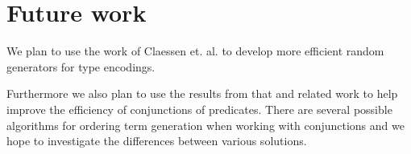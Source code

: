 \section{Future work}
We plan to use the work of Claessen et. al. \cite{Claessen2014generating}
to develop more efficient random
generators for type encodings.

Furthermore we also plan to use the
results from that and related work to
help improve the efficiency
of conjunctions of predicates.
There are several possible algorithms for
ordering term generation when working with
conjunctions and we hope to investigate the
differences between various solutions.
